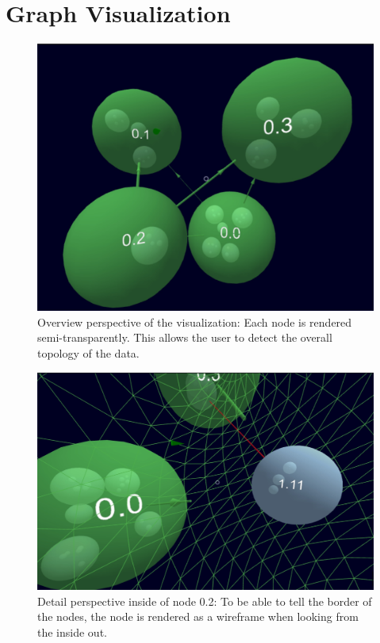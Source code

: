 \section{Graph Visualization}
\label{chap:ps-graphRepresentation}
\begin{figure}[!htb]
    \centering
    \includegraphics[width=1\textwidth]{graphics/screenshotNesting.jpg}
    \caption[Screenshot of the visualization.]{Overview perspective of the visualization: Each node is rendered semi-transparently. This allows the user to detect the overall topology of the data.}
    \label{fig:ps_nestedLayout}
\end{figure}
\begin{figure}[!htb]
    \centering
    \includegraphics[width=1\textwidth]{graphics/screenshotNestingAndWireframe.jpg}
    \caption[Screenshot of the visualization.]{Detail perspective inside of node 0.2: To be able to tell the border of the nodes, the node is rendered as a wireframe when looking from the inside out.}
    \label{fig:ps_wireframe}
\end{figure}
